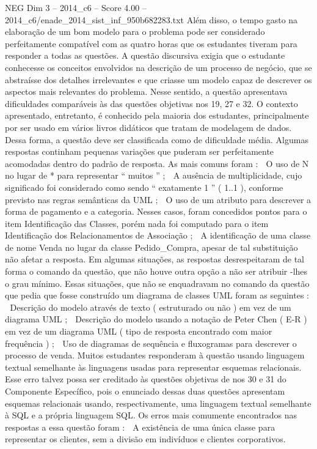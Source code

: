 \begin{textsample}{NEG Dim 3 – 2014\_c6 – Score 4.00 – 2014\_c6/enade\_2014\_sist\_inf\_950b682283.txt}
Além disso, o tempo gasto na elaboração de um bom modelo para o problema pode ser considerado perfeitamente compatível com as quatro horas que os estudantes tiveram para responder a todas as questões.
A questão discursiva exigia que o estudante conhecesse os conceitos envolvidos na descrição de um processo de negócio, que se abstraísse dos detalhes irrelevantes e que criasse um modelo capaz de descrever os aspectos mais relevantes do problema.
Nesse sentido, a questão apresentava dificuldades comparáveis às das questões objetivas nos 19, 27 e 32.
O contexto apresentado, entretanto, é conhecido pela maioria dos estudantes, principalmente por ser usado em vários livros didáticos que tratam de modelagem de dados.
Dessa forma, a questão deve ser classificada como de dificuldade média.
Algumas respostas continham pequenas variações que puderam ser perfeitamente acomodadas dentro do padrão de resposta.
As mais comuns foram :  O uso de N no lugar de * para representar “ muitos ” ;  A ausência de multiplicidade, cujo significado foi considerado como sendo “ exatamente 1 ” ( 1..1 ), conforme previsto nas regras semânticas da UML ;  O uso de um atributo para descrever a forma de pagamento e a categoria.
Nesses casos, foram concedidos pontos para o item Identificação das Classes, porém nada foi computado para o item Identificação dos Relacionamentos de Associação ;  A identificação de uma classe de nome Venda no lugar da classe Pedido\_Compra, apesar de tal substituição não afetar a resposta.
Em algumas situações, as respostas desrespeitaram de tal forma o comando da questão, que não houve outra opção a não ser atribuir -lhes o grau mínimo.
Essas situações, que não se enquadravam no comando da questão que pedia que fosse construído um diagrama de classes UML foram as seguintes :  Descrição do modelo através de texto ( estruturado ou não ) em vez de um diagrama UML ;  Descrição do modelo usando a notação de Peter Chen ( E-R ) em vez de um diagrama UML ( tipo de resposta encontrado com maior frequência ) ;  Uso de diagramas de sequência e fluxogramas para descrever o processo de venda.
Muitos estudantes responderam à questão usando linguagem textual semelhante às linguagens usadas para representar esquemas relacionais.
Esse erro talvez possa ser creditado às questões objetivas de nos 30 e 31 do Componente Específico, pois o enunciado dessas duas questões apresentam esquemas relacionais usando, respectivamente, uma linguagem textual semelhante à SQL e a própria linguagem SQL.
Os erros mais comumente encontrados nas respostas a essa questão foram :  A existência de uma única classe para representar os clientes, sem a divisão em indivíduos e clientes corporativos.

\end{textsample}
